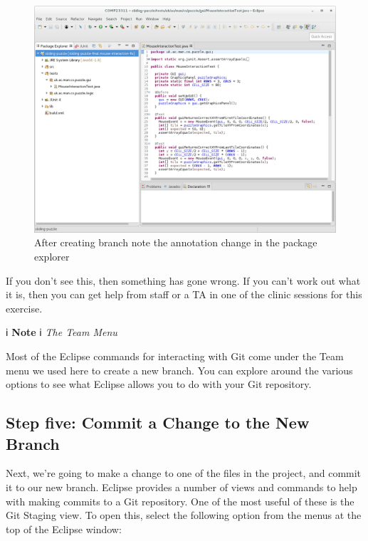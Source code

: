 \documentclass[
]{book}
\begin{document}
\begin{figure}

{\centering \includegraphics[width=1\linewidth]{images/afterCreateBranchSeeTheAnnotationChangeInPackageExplorer} 

}

\caption{After creating branch note the annotation change in the package explorer}\label{fig:afterCreateBranchSeeTheAnnotationChangeInPackageExplorer-fig}
\end{figure}

If you don't see this, then something has gone wrong. If you can't work out what it is, then you can get help from staff or a TA in one of the clinic sessions for this exercise.

ℹ️ \textbf{Note} ℹ️
\emph{The Team Menu}

Most of the Eclipse commands for interacting with Git come under the Team menu we used here to create a new branch. You can explore around the various options to see what Eclipse allows you to do with your Git repository.

\hypertarget{commitnew}{%
\subsection{Step five: Commit a Change to the New Branch}\label{commitnew}}

Next, we're going to make a change to one of the files in the project, and commit it to our new branch. Eclipse provides a number of views and commands to help with making commits to a Git repository. One of the most useful of these is the Git Staging view. To open this, select the following option from the menus at the top of the Eclipse window:
\end{document}
